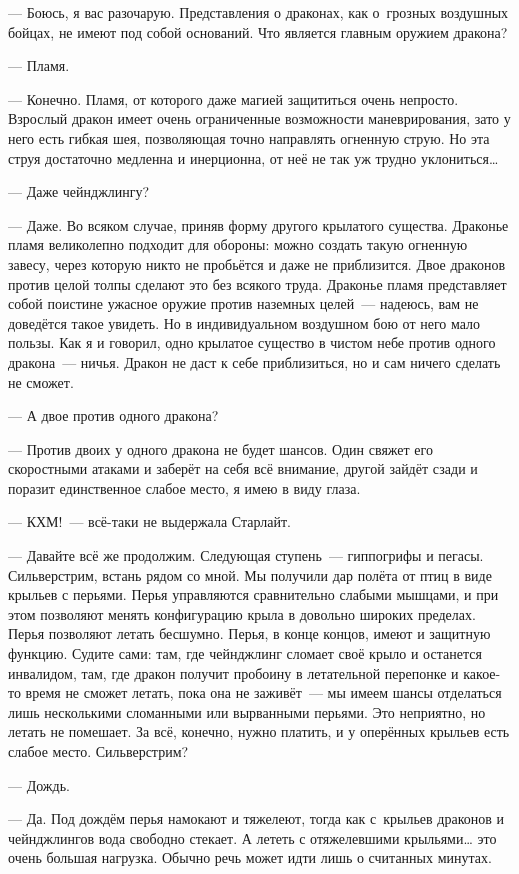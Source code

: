 \documentclass[fontsize=11pt,a5paper,titlepage=firstcover]{scrbook}
\begin{document}
--- Боюсь, я вас разочарую. Представления о драконах, как о~грозных воздушных бойцах, не имеют под собой оснований. Что является главным оружием дракона?

--- Пламя.

--- Конечно. Пламя, от которого даже магией защититься очень непросто. Взрослый дракон имеет очень ограниченные возможности маневрирования, зато у него есть гибкая шея, позволяющая точно направлять огненную струю. Но эта струя достаточно медленна и инерционна, от неё не так уж трудно уклониться{\ldots}

--- Даже чейнджлингу?

--- Даже. Во всяком случае, приняв форму другого крылатого существа. Драконье пламя великолепно подходит для обороны: можно создать такую огненную завесу, через которую никто не пробьётся и даже не приблизится. Двое драконов против целой толпы сделают это без всякого труда. Драконье пламя представляет собой поистине ужасное оружие против наземных целей~--- надеюсь, вам не доведётся такое увидеть. Но в индивидуальном воздушном бою от него мало пользы. Как я и говорил, одно крылатое существо в чистом небе против одного дракона~--- ничья. Дракон не даст к себе приблизиться, но и сам ничего сделать не сможет.

--- А двое против одного дракона?

--- Против двоих у одного дракона не будет шансов. Один свяжет его скоростными атаками и заберёт на себя всё внимание, другой зайдёт сзади и поразит единственное слабое место, я имею в виду глаза.

--- КХМ!~--- всё-таки не выдержала Старлайт.

--- Давайте всё же продолжим. Следующая ступень~--- гиппогрифы и пегасы. Сильверстрим, встань рядом со мной. Мы получили дар полёта от птиц в виде крыльев с перьями. Перья управляются сравнительно слабыми мышцами, и при этом позволяют менять конфигурацию крыла в довольно широких пределах. Перья позволяют летать бесшумно. Перья, в конце концов, имеют и защитную функцию. Судите сами: там, где чейнджлинг сломает своё крыло и останется инвалидом, там, где дракон получит пробоину в летательной перепонке и какое-то время не сможет летать, пока она не заживёт~--- мы имеем шансы отделаться лишь несколькими сломанными или вырванными перьями. Это неприятно, но летать не помешает. За всё, конечно, нужно платить, и у оперённых крыльев есть слабое место. Сильверстрим?

--- Дождь.

--- Да. Под дождём перья намокают и тяжелеют, тогда как с~крыльев драконов и чейнджлингов вода свободно стекает. А лететь с отяжелевшими крыльями{\ldots} это очень большая нагрузка. Обычно речь может идти лишь о считанных минутах.
\end{document}
